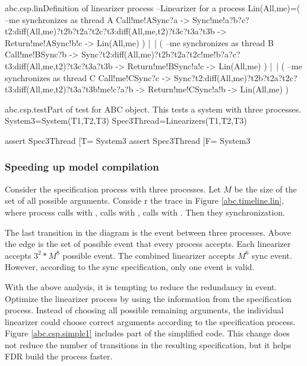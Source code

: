 \documentclass[a4paper, 12pt]{article}
\begin{document}
\begin{cspfloat}{abc.csp.lin}{Definition of linearizer process}
--Linearizer for a process
Lin(All,me)=(
  --me synchronizes as thread A
  Call!me!ASync?a ->
  Sync!me!a?b?c?t2:diff(All,{me})?t2b?t2a?t2c?t3:diff(All,{me,t2})?t3c?t3a?t3b ->
  Return!me!ASync!b!c ->
  Lin(All,me)
) |~| (
  --me synchronizes as thread B
  Call!me!BSync?b ->
  Sync?t2:diff(All,{me})?t2b?t2a?t2c!me!b?a?c?t3:diff(All,{me,t2})?t3c?t3a?t3b ->
  Return!me!BSync!a!c ->
  Lin(All,me)
) |~| (
  --me synchronizes as thread C
  Call!me!CSync?c ->
  Sync?t2:diff(All,{me})?t2b?t2a?t2c?t3:diff(All,{me,t2})?t3a?t3b!me!c?a?b ->
  Return!me!CSync!a!b ->
  Lin(All,me)
)
\end{cspfloat}

\begin{cspinline}{abc.csp.test}{Part of test for ABC object. This tests a system with three processes.}
System3=System({T1,T2,T3})
Spec3Thread=Linearizers({T1,T2,T3})

assert Spec3Thread [T= System3
assert Spec3Thread [F= System3
\end{cspinline}
\subsubsection{Speeding up model compilation}
Consider the specification process with three processes. Let $M$ be the size of the set of all possible arguments. Conside r the trace in Figure \ref{abc.timeline.lin}, where process  calls  with ,  calls  with ,  calls  with . Then they synchronization.


The last transition in the diagram is the  event between three processes. Above the edge is the set of possible  event that every process accepts. Each linearizer accepts $3^2*M^8$ possible  event. The combined linearizer accepts $M^6$ sync event. However, according to the sync specification, only one  event is valid. 
    
With the above analysis, it is tempting to reduce the redundancy in  event. Optimize the linearizer process by using the information from the specification process. Instead of choosing all possible remaining arguments, the individual linearizer could choose correct arguments according to the specification process. Figure \ref{abc.csp.simple1} includes part of the simplified code. This change does not reduce the number of transitions in the resulting specification, but it helps FDR build the process faster.
\end{document}
